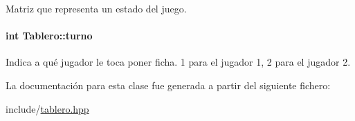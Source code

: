 Matriz que representa un estado del juego. 

\hypertarget{classTablero_ae460b4a3245da075dd381365abf158bc}{
\paragraph[{turno}]{\setlength{\rightskip}{0pt plus 5cm}int Tablero\-::turno\hspace{0.3cm}{\ttfamily [private]}}}\label{classTablero_ae460b4a3245da075dd381365abf158bc}


Indica a qué jugador le toca poner ficha. 1 para el jugador 1, 2 para el jugador 2. 



La documentación para esta clase fue generada a partir del siguiente fichero\-:\begin{DoxyCompactItemize}
\item 
include/\hyperlink{tablero_8hpp}{tablero.\-hpp}\end{DoxyCompactItemize}
